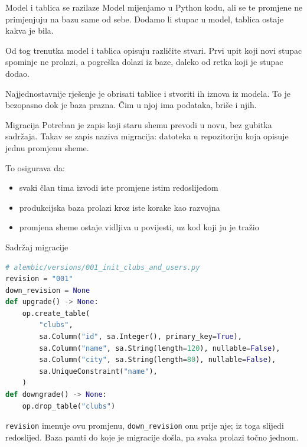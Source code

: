 
\begin{frame}{Model i tablica se razilaze}
Model mijenjamo u Python kodu, ali se te promjene ne primjenjuju na bazu same od sebe. Dodamo li stupac u model, tablica ostaje kakva je bila.

\vspace{0.5em}
Od tog trenutka model i tablica opisuju različite stvari. Prvi upit koji novi stupac spominje ne prolazi, a pogreška dolazi iz baze, daleko od retka koji je stupac dodao.

\vspace{0.5em}
Najjednostavnije rješenje je obrisati tablice i stvoriti ih iznova iz modela. To je bezopasno dok je baza prazna. Čim u njoj ima podataka, briše i njih.
\end{frame}

\begin{frame}{Migracija}
Potreban je zapis koji staru shemu prevodi u novu, bez gubitka sadržaja. Takav se zapis naziva migracija: datoteka u repozitoriju koja opisuje jednu promjenu sheme.

\vspace{0.5em}
To osigurava da:

\begin{itemize}
  \item svaki član tima izvodi iste promjene istim redoslijedom
  \item produkcijska baza prolazi kroz iste korake kao razvojna
  \item promjena sheme ostaje vidljiva u povijesti, uz kod koji ju je tražio
\end{itemize}
\end{frame}

\begin{frame}[fragile]{Sadržaj migracije}
\begin{lstlisting}[language=python]
# alembic/versions/001_init_clubs_and_users.py
revision = "001"
down_revision = None
def upgrade() -> None:
    op.create_table(
        "clubs",
        sa.Column("id", sa.Integer(), primary_key=True),
        sa.Column("name", sa.String(length=120), nullable=False),
        sa.Column("city", sa.String(length=80), nullable=False),
        sa.UniqueConstraint("name"),
    )
def downgrade() -> None:
    op.drop_table("clubs")
\end{lstlisting}

\vspace{0.2em}
\texttt{revision} imenuje ovu promjenu, \texttt{down\_revision} onu prije nje; iz toga slijedi redoslijed. Baza pamti do koje je migracije došla, pa svaka prolazi točno jednom.
\end{frame}


